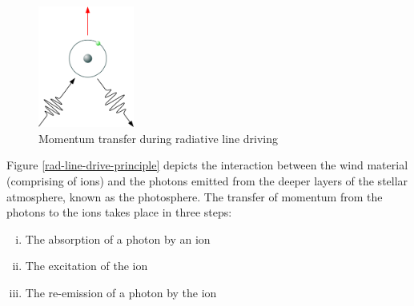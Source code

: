 		\begin{figure}[h!]
			\centering
			\includegraphics[height=4cm]{rad-line-drive-04}
			\caption{Momentum transfer during radiative line driving}
			\label{rad-line-drive-momentum}
		\end{figure}
		Figure \ref{rad-line-drive-principle} depicts the interaction between the wind material (comprising of ions) and the photons emitted from the deeper layers of the stellar atmosphere, known as the photosphere. The transfer of momentum from the photons to the ions takes place in three steps:
		\begin{enumerate}[i.]
			\item The absorption of a photon by an ion
			\item The excitation of the ion
			\item The re-emission of a photon by the ion
		\end{enumerate}
